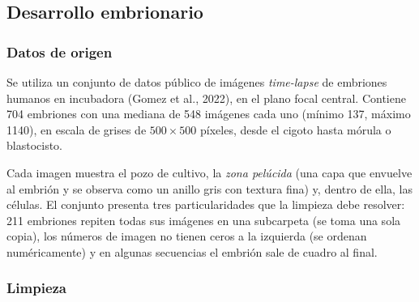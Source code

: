\subsection{Desarrollo embrionario}\label{sec:exp2_embriones}

\subsubsection{Datos de origen}

Se utiliza un conjunto de datos público de imágenes \textit{time-lapse} de embriones humanos en incubadora (Gomez et al., 2022), en el plano focal central. Contiene 704 embriones con una mediana de 548 imágenes cada uno (mínimo 137, máximo 1140), en escala de grises de $500 \times 500$ píxeles, desde el cigoto hasta mórula o blastocisto.

Cada imagen muestra el pozo de cultivo, la \textit{zona pelúcida} (una capa que envuelve al embrión y se observa como un anillo gris con textura fina) y, dentro de ella, las células. El conjunto presenta tres particularidades que la limpieza debe resolver: 211 embriones repiten todas sus imágenes en una subcarpeta (se toma una sola copia), los números de imagen no tienen ceros a la izquierda (se ordenan numéricamente) y en algunas secuencias el embrión sale de cuadro al final.

\subsubsection{Limpieza}

